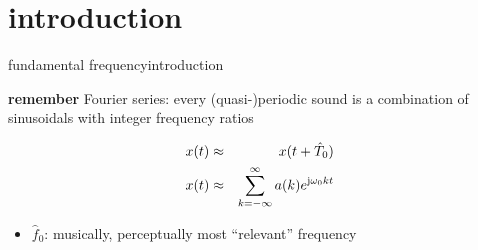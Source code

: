     \section[intro]{introduction}

	\begin{frame}{fundamental frequency}{introduction}
        \begin{block}{\textbf{remember}}
            Fourier series: every (quasi-)periodic sound is a combination of sinusoidals with integer frequency ratios
        \end{block}
        \begin{eqnarray*}
            x(t) 	&\approx& x(t+\hat{T}_0)\nonumber\\
            x(t) &\approx& \sum\limits_{k=-\infty}^{\infty} a(k) {e}^{\mathrm{j}\omega_0kt}\nonumber
        \end{eqnarray*}
        
		\begin{itemize}
			\item<2->[]	$\hat{f}_0$: musically, perceptually most ``relevant'' frequency
		\end{itemize}
	\end{frame}
    

